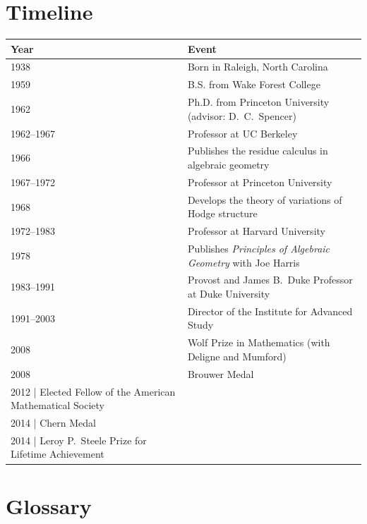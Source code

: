 \section*{Timeline}

\begin{tabularx}{\linewidth}{|p{1.5cm}|>{\raggedright\arraybackslash}X|}
\hline
\textbf{Year} & \textbf{Event} \\ \hline
1938 & Born in Raleigh, North Carolina \\ \hline
1959 & B.S. from Wake Forest College \\ \hline
1962 & Ph.D. from Princeton University (advisor: D.\ C.\ Spencer) \\ \hline
1962--1967 & Professor at UC Berkeley \\ \hline
1966 & Publishes the residue calculus in algebraic geometry \\ \hline
1967--1972 & Professor at Princeton University \\ \hline
1968 & Develops the theory of variations of Hodge structure \\ \hline
1972--1983 & Professor at Harvard University \\ \hline
1978 & Publishes \textit{Principles of Algebraic Geometry} with Joe Harris \\ \hline
1983--1991 & Provost and James B.\ Duke Professor at Duke University \\ \hline
1991--2003 & Director of the Institute for Advanced Study \\ \hline
2008 & Wolf Prize in Mathematics (with Deligne and Mumford) \\ \hline
2008 & Brouwer Medal \\ \hline
2012 | Elected Fellow of the American Mathematical Society \\ \hline
2014 | Chern Medal \\ \hline
2014 | Leroy P.\ Steele Prize for Lifetime Achievement \\ \hline
\end{tabularx}

\section*{Glossary}


